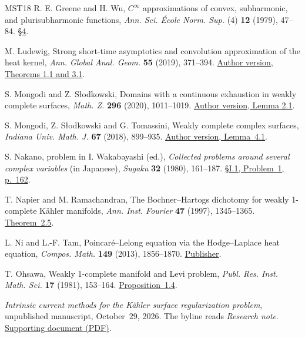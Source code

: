 \documentclass[11pt]{amsart}
\theoremstyle{remark}
\numberwithin{equation}{section}
\begin{document}
\begin{thebibliography}{MST18}
 R. E. Greene and H. Wu,
$C^\infty$ approximations of convex, subharmonic, and plurisubharmonic
functions, \emph{Ann. Sci. \'Ecole Norm. Sup.} (4) \textbf{12} (1979),
47--84. \href{https://doi.org/10.24033/asens.1361}{\S4}.

 M. Ludewig, Strong short-time asymptotics and
convolution approximation of the heat kernel,
\emph{Ann. Global Anal. Geom.} \textbf{55} (2019), 371--394.
\href{https://arxiv.org/abs/1607.05152}{Author version, Theorems 1.1 and 3.1}.

 S. Mongodi and Z. S{\l}odkowski,
Domains with a continuous exhaustion in weakly complete surfaces,
\emph{Math. Z.} \textbf{296} (2020), 1011--1019.
\href{https://arxiv.org/abs/1904.03497}{Author version, Lemma 2.1}.

 S. Mongodi, Z. S{\l}odkowski and G. Tomassini,
Weakly complete complex surfaces,
\emph{Indiana Univ. Math. J.} \textbf{67} (2018), 899--935.
\href{https://arxiv.org/abs/1504.07215}{Author version, Lemma~4.1}.

 S. Nakano, problem in I. Wakabayashi (ed.),
\emph{Collected problems around several complex variables} (in Japanese),
\emph{Sugaku} \textbf{32} (1980), 161--187.
\href{https://doi.org/10.11429/sugaku1947.32.161}{\S I.1, Problem~1, p.~162}.

 T. Napier and M. Ramachandran, The Bochner--Hartogs
dichotomy for weakly 1-complete K\"ahler manifolds, \emph{Ann. Inst.
Fourier} \textbf{47} (1997), 1345--1365.
\href{https://doi.org/10.5802/aif.1602}{Theorem~2.5}.

 L. Ni and L.-F. Tam, Poincar\'e--Lelong equation via
the Hodge--Laplace heat equation, \emph{Compos. Math.} \textbf{149}
(2013), 1856--1870. \href{https://doi.org/10.1112/S0010437X12000322}{Publisher}.

 T. Ohsawa, Weakly 1-complete manifold and Levi problem,
\emph{Publ. Res. Inst. Math. Sci.} \textbf{17} (1981), 153--164.
\href{https://doi.org/10.2977/PRIMS/1195186709}{Proposition~1.4}.

 \emph{Intrinsic current methods for the K\"ahler surface
regularization problem}, unpublished manuscript, October~29, 2026.
The byline reads \emph{Research note}.
\href{https://github.com/chen-zhijian/surface-regularization/blob/main/supporting_notes/intrinsic-current-methods/note.pdf}{Supporting document (PDF)}.


\end{thebibliography}
\end{document}
